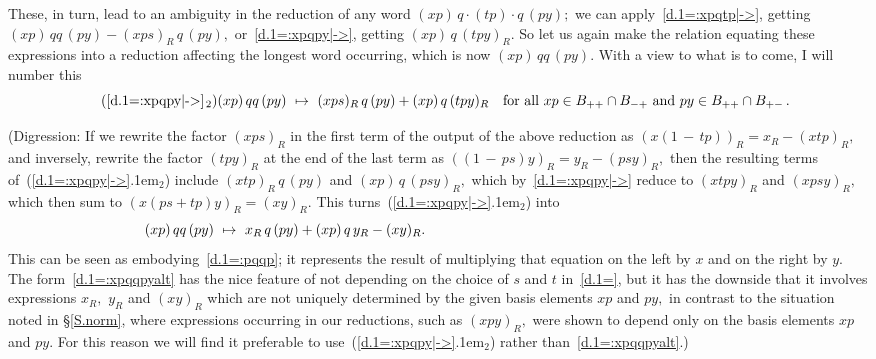 \documentclass{amsart}
\begin{document}
These, in turn, lead to an ambiguity in the reduction of
any word $(xp)\,q\cdot(tp)\cdot q\,(py);$
we can apply~\eqref{d.1=:xpqtp|->}, getting
$(xp)\,qq\,(py)-(xps)_R\,q\,(py),$
or~\eqref{d.1=:xpqpy|->}, getting $(xp)\,q\,(tpy)_R.$
So let us again make the relation equating these
expressions into a reduction affecting the longest word
occurring, which is now $(xp)\,qq\,(py).$
With a view to what is to come, I will number this
\begin{equation}\tag{{{\setlength{\mathsurround}{0em}\ref{d.1=:xpqpy|->}\kern.1em$_{{2}}$}}}\begin{minipage}[c]{35pc}
$(xp)\,qq\,(py)\ \mapsto\ (xps)_R\,q\,(py)+(xp)\,q\,(tpy)_R$\quad
for all $xp\in B_{++}\cap B_{-+}$ and $py\in B_{++}\cap B_{+-}\,.$
\end{minipage}\end{equation}

(Digression: If we rewrite the factor $(xps)_R$ in the first term
of the output of the above
reduction as $(x(1\,{-}\,tp))_R=x_R-(xtp)_R,$ and inversely,
rewrite the factor $(tpy)_R$ at the end of the last term as
$((1\,{-}\,ps)y)_R=y_R-(psy)_R,$ then
the resulting terms of~({{\setlength{\mathsurround}{0em}\ref{d.1=:xpqpy|->}\kern.1em$_{{2}}$}}) include
$(xtp)_R\,q\,(py)$ and $(xp)\,q\,(psy)_R,$ which
by~\eqref{d.1=:xpqpy|->} reduce to $(xtpy)_R$ and $(xpsy)_R,$
which then sum to $(x(ps+tp)y)_R=(xy)_R.$
This turns~({{\setlength{\mathsurround}{0em}\ref{d.1=:xpqpy|->}\kern.1em$_{{2}}$}}) into
\begin{equation}\begin{minipage}[c]{35pc}\label{d.1=:xpqqpyalt}
$(xp)\,qq\,(py)\ \mapsto\ x_R\,q\,(py)+(xp)\,q\,y_R-(xy)_R.$
\end{minipage}\end{equation}
This can be seen as embodying~\eqref{d.1=:pqqp}; it represents
the result of multiplying that equation on the
left by $x$ and on the right by $y.$
The form~\eqref{d.1=:xpqqpyalt} has the nice feature of
not depending on the choice of $s$ and $t$
in~\eqref{d.1=}, but it has the downside
that it involves expressions $x_R,$ $y_R$ and $(xy)_R$ which
are not uniquely determined by the given basis elements
$xp$ and $py,$ in contrast to the situation noted in \S\ref{S.norm},
where expressions occurring in our reductions, such as $(xpy)_R,$
were shown to depend only on the basis elements $xp$ and $py.$
For this reason we will find it preferable to
use~({{\setlength{\mathsurround}{0em}\ref{d.1=:xpqpy|->}\kern.1em$_{{2}}$}}) rather than~\eqref{d.1=:xpqqpyalt}.)
\end{document}
